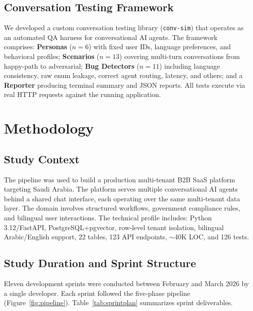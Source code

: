 \documentclass[a4paper,USenglish,cleveref,autoref]{lipics-v2021}
\begin{document}
\subsection{Conversation Testing Framework}
\label{sec:convsim}

We developed a custom conversation testing library (\texttt{conv-sim}) that operates as an automated QA harness for conversational AI agents. The framework comprises: \textbf{Personas} ($n=6$) with fixed user IDs, language preferences, and behavioral profiles; \textbf{Scenarios} ($n=13$) covering multi-turn conversations from happy-path to adversarial; \textbf{Bug Detectors} ($n=11$) including language consistency, raw enum leakage, correct agent routing, latency, and others; and a \textbf{Reporter} producing terminal summary and JSON reports. All tests execute via real HTTP requests against the running application.

\section{Methodology}
\label{sec:methodology}

\subsection{Study Context}

The pipeline was used to build a production multi-tenant B2B SaaS platform targeting Saudi Arabia. The platform serves multiple conversational AI agents behind a shared chat interface, each operating over the same multi-tenant data layer. The domain involves structured workflows, government compliance rules, and bilingual user interactions. The technical profile includes: Python 3.12/FastAPI, PostgreSQL+pgvector, row-level tenant isolation, bilingual Arabic/English support, 22 tables, 123 API endpoints, ${\sim}$40K LOC, and 126 tests.

\subsection{Study Duration and Sprint Structure}

Eleven development sprints were conducted between February and March 2026 by a single developer. Each sprint followed the five-phase pipeline (Figure~\ref{fig:pipeline}). Table~\ref{tab:sprintplan} summarizes sprint deliverables.
\end{document}
